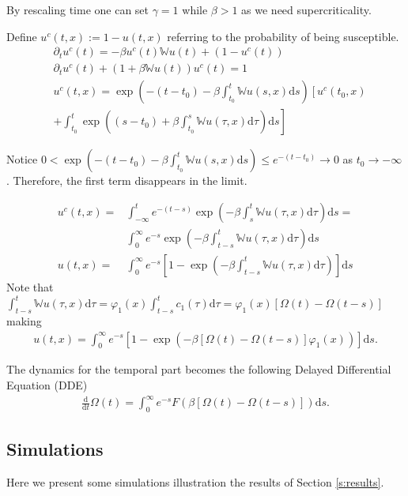 \documentclass{article}
\renewcommand{\d}{\mathrm{d}}
\newcommand{\W}{\mathbb{W}}
\newcommand{\1}[1]{{\mathds{1}}_{\left\{#1\right\}}}
\begin{document}
By rescaling time one can set $\gamma=1$ while $\beta>1$ as we need supercriticality.

Define $u^c(t,x):=1-u(t,x)$ referring to the probability of being susceptible.
\begin{align*}
&\partial_t u^c(t)=-\beta u^c(t) \W u(t)+(1-u^c(t)) \\
&\partial_t u^c(t)+\left(1+\beta \W u(t) \right)u^c(t)=1 \\
&u^c(t,x)=\exp \left(-(t-t_0)-\beta\int_{t_0}^{t} \W u(s,x) \d s \right) \left[u^c(t_0,x) \right. \\
& \left.+\int_{t_0}^{t} \exp\left((s-t_0)+\beta \int_{t_0}^{s} \W u(\tau,x) \d \tau\right) \d s \right]
\end{align*}

Notice $0 <\exp \left(-(t-t_0)- \beta\int_{t_0}^{t}\W u(s,x) \d s \right) \leq e^{-(t-t_0)} \to 0$ as $t_0 \to -\infty$. Therefore, the first term disappears in the limit.

\begin{align*}
u^c(t,x)=&\int_{-\infty}^{t}e^{-(t-s)} \exp \left(-\beta \int_{s}^{t} \W u(\tau,x) \d \tau \right) \d s= \\
 &\int_{0}^{\infty} e^{-s} \exp \left(-\beta \int_{t-s}^{t} \W u(\tau,x) \d \tau \right)  \d s\\
 u(t,x)=&\int_{0}^{\infty} e^{-s}\left[ 1-\exp \left(-\beta \int_{t-s}^{t} \W u(\tau,x) \d \tau \right) \right] \d s
\end{align*}
Note that $\int_{t-s}^{t} \W u(\tau,x) \d \tau=\varphi_1(x)\int_{t-s}^{t} c_1(\tau) \d \tau=\varphi_1(x) \left[\Omega(t)-\Omega(t-s) \right]$ making
\begin{align}
\label{eq:SIS_explicit1}
u(t,x)=\int_{0}^{\infty}e^{-s}\left[1-\exp \left(-\beta \left[\Omega(t)-\Omega(t-s) \right] \varphi_1(x) \right) \right] \d s.	
\end{align}

The dynamics for the temporal part becomes the following Delayed Differential Equation (DDE)
\begin{align}
\label{eq:Omega_DDE}
\frac{\d}{\d t} \Omega(t)=\int_{0}^{\infty} e^{-s}F \left(\beta \left[\Omega(t)-\Omega(t-s) \right] \right) \d s.
\end{align}

\subsection{Simulations}
\label{s:simulation}

Here we present some simulations illustration the results of Section \ref{s:results}.
\end{document}
